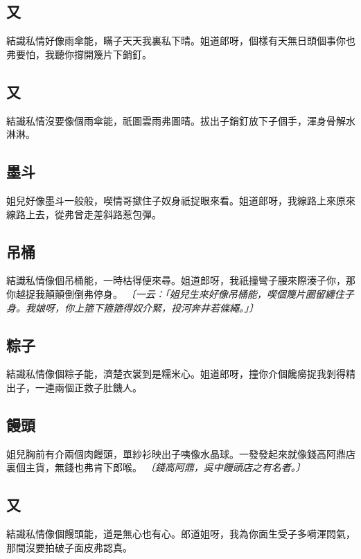 \subsection*{又}

結識私情好像雨傘能，瞞子天天我裏私下晴。姐道郎呀，個樣有天無日頭個事你也弗要怕，我聽你撐開篾片下銷釘。

\subsection*{又}

結識私情沒要像個雨傘能，祇圖雲雨弗圖晴。拔出子銷釘放下子個手，渾身骨解水淋淋。

\subsection*{墨斗}

姐兒好像墨斗一般般，喫情哥撳住子奴身祇捉眼來看。姐道郎呀，我線路上來原來線路上去，從弗曾走差斜路惹包彈。

\subsection*{吊桶}

結識私情像個吊桶能，一時枯得便來尋。姐道郎呀，我祇撞彎子腰來際湊子你，那你越捉我顛顛倒倒弗停身。
\textit{〔一云：「姐兒生來好像吊桶能，喫個篾片圈留纏住子身。我娘呀，你上箍下箍箍得奴介緊，投河奔井若條繩。」〕}

\subsection*{粽子}

結識私情像個粽子能，濟楚衣裳到是糯米心。姐道郎呀，撞你介個饞癆捉我剝得精出子，一連兩個正救子肚饑人。

\subsection*{饅頭}

姐兒胸前有介兩個肉饅頭，單紗衫映出子咦像水晶球。一發發起來就像錢高阿鼎店裏個主貨，無錢也弗肯下郎喉。
\textit{〔錢高阿鼎，吳中饅頭店之有名者。〕}

\subsection*{又}

結識私情像個饅頭能，道是無心也有心。郎道姐呀，我為你面生受子多嗬渾悶氣，那間沒要拍破子面皮弗認真。

